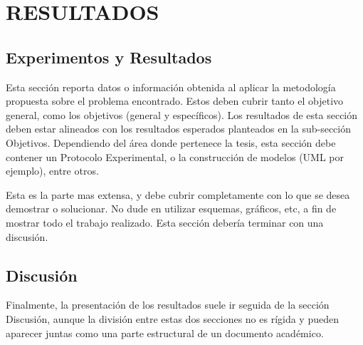 \documentclass[../main.tex]{subfiles}
\begin{document}
\chapter{RESULTADOS}

\section{Experimentos y Resultados}

Esta sección reporta datos o información obtenida al aplicar la metodología propuesta sobre el problema encontrado. Estos deben cubrir tanto el objetivo general, como los objetivos (general y específicos). Los resultados de esta sección deben estar alineados con los resultados esperados planteados en la sub-sección Objetivos. Dependiendo del área donde pertenece la tesis, esta sección debe contener un Protocolo Experimental, o la construcción de modelos (UML por ejemplo), entre otros.

Esta es la parte mas extensa, y debe cubrir completamente con lo que se desea demostrar o solucionar. No dude en utilizar esquemas, gráficos, etc, a fin de mostrar todo el trabajo realizado. Esta sección debería terminar con una discusión.

\section{Discusión}

Finalmente, la presentación de los resultados suele ir seguida de la sección Discusión, aunque la división entre estas dos secciones no es rígida y pueden aparecer juntas como una parte estructural de un documento académico.
\end{document}
